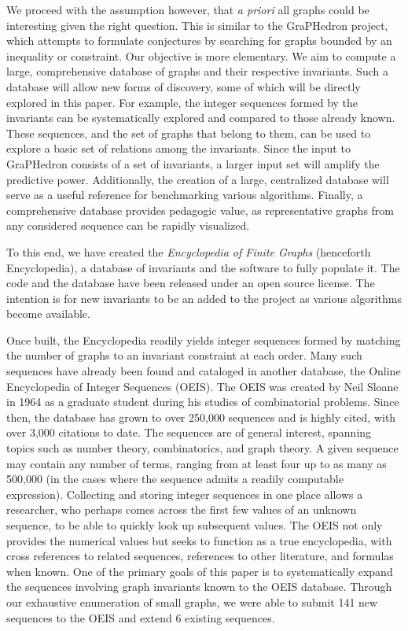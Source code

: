 \documentclass[12pt]{article}
\newcommand{\OEISeditsMain}{141\xspace}
\newcommand{\OEISeditsExtended}{6\xspace}
\begin{document}
We proceed with the assumption however, that \textit{a priori} all graphs could be interesting given the right question.
This is similar to the GraPHedron project\cite{melot2008facet}, which attempts to formulate conjectures by searching for graphs bounded by an inequality or constraint.
Our objective is more elementary. We aim to compute a large, comprehensive database of graphs and their respective invariants. 
Such a database will allow new forms of discovery, some of which will be directly explored in this paper.
For example, the integer sequences formed by the invariants can be systematically explored and compared to those already known.
These sequences, and the set of graphs that belong to them, can be used to explore a basic set of relations among the invariants. 
Since the input to GraPHedron consists of a set of invariants, a larger input set will amplify the predictive power.
Additionally, the creation of a large, centralized database will serve as a useful reference for benchmarking various algorithms.
Finally, a comprehensive database provides pedagogic value, as representative graphs from any considered sequence can be rapidly visualized.

To this end, we have created the \textit{Encyclopedia of Finite Graphs} (henceforth Encyclopedia), a database of invariants\cite{Travis2014SimpleConnectedGraphs} and the software to fully populate it\cite{Travis2014Encyclopdia}. 
The code and the database have been released under an open source license.
The intention is for new invariants to be an added to the project as various algorithms become available.

Once built, the Encyclopedia readily yields integer sequences formed by matching the number of graphs to an invariant constraint at each order.
Many such sequences have already been found and cataloged in another database, the Online Encyclopedia of Integer Sequences (OEIS)\cite{sloane2003line}.
The OEIS was created by Neil Sloane in 1964 as a graduate student during his studies of combinatorial problems.
Since then, the database has grown to over 250,000 sequences and is highly cited, with over 3,000 citations to date.
The sequences are of general interest, spanning topics such as number theory, combinatorics, and graph theory.
A given sequence may contain any number of terms, ranging from at least four up to as many as 500,000 (in the cases where the sequence admits a readily computable expression).
Collecting and storing integer sequences in one place allows a researcher, who perhaps comes across the first few values of an unknown sequence, to be able to quickly look up subsequent values. 
The OEIS not only provides the numerical values but seeks to function as a true encyclopedia, with cross references to related sequences, references to other literature, and formulas when known.
One of the primary goals of this paper is to systematically expand the sequences involving graph invariants known to the OEIS database.
Through our exhaustive enumeration of small graphs, we were able to submit \OEISeditsMain new sequences to the OEIS and extend \OEISeditsExtended existing sequences.
\end{document}
